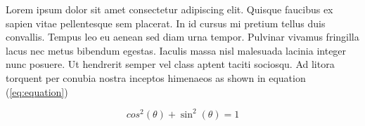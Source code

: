 \documentclass{article}
\begin{document}
Lorem ipsum dolor sit amet consectetur adipiscing elit. Quisque
faucibus ex sapien vitae pellentesque sem placerat. In id cursus mi
pretium tellus duis convallis. Tempus leo eu aenean sed diam urna
tempor. Pulvinar vivamus fringilla lacus nec metus bibendum egestas.
Iaculis massa nisl malesuada lacinia integer nunc posuere. Ut
hendrerit semper vel class aptent taciti sociosqu. Ad litora torquent
per conubia nostra inceptos himenaeos as shown in equation (\ref{eq:equation})

\begin{equation}
  \label{eq:equation}
  cos^{2}(\theta) + \sin^{2}(\theta) =1
\end{equation}
\end{document}
